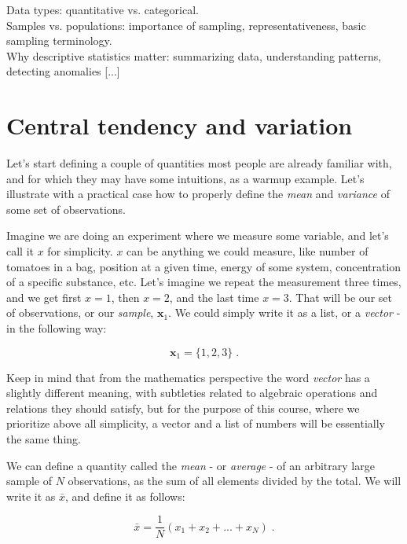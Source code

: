 \documentclass{book}
\begin{document}
Data types: quantitative vs. categorical.\\

Samples vs. populations: importance of sampling, representativeness, basic sampling terminology. \\

Why descriptive statistics matter: summarizing data, understanding patterns, detecting anomalies [...]

\section{Central tendency and variation}

Let's start defining a couple of quantities most people are already familiar with, and for which they may have some intuitions, as a warmup example. Let's illustrate with a practical case how to properly define the \textit{mean} and \textit{variance} of some set of observations.

\medskip
	
Imagine we are doing an experiment where we measure some variable, and let's call it $x$ for simplicity. $x$ can be anything we could measure, like number of tomatoes in a bag, position at a given time, energy of some system, concentration of a specific substance, etc. Let's imagine we repeat the measurement three times, and we get first $x = 1$, then $x = 2$, and the last time $x = 3$. That will be our set of observations, or our \textit{sample}, $\textbf{x}_{1}$. We could simply write it as a list, or a \textit{vector} - in the following way:

\begin{equation}
\textbf{x}_{1} = \{1, 2, 3\} \; . \nonumber  
\end{equation}

Keep in mind that from the mathematics perspective the word \textit{vector} has a slightly different meaning, with subtleties related to algebraic operations and relations they should satisfy, but for the purpose of this course, where we prioritize above all simplicity, a vector and a list of numbers will be essentially the same thing.

\medskip

We can define a quantity called the \textit{mean} - or \textit{average} - of an arbitrary large sample of $N$ observations, as the sum of all elements divided by the total. We will write it as $\bar{x}$, and define it as follows:

\begin{equation}
\bar{x} = \frac{1}{N} (x_{1} + x_{2} + ... + x_{N}) \; .
\label{mean1}
\end{equation}
\end{document}
